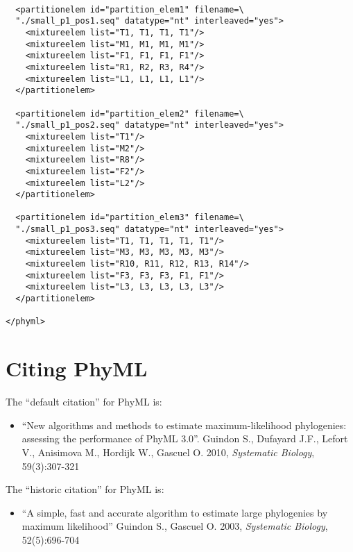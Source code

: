 \documentclass[a4paper,12pt]{article}
\begin{document}
\vspace{0.2cm}
\begin{Verbatim}[frame=single, label=Example of PhyML XML file (ctnd), samepage=true, baselinestretch=0.5]

  <partitionelem id="partition_elem1" filename=\
  "./small_p1_pos1.seq" datatype="nt" interleaved="yes">
    <mixtureelem list="T1, T1, T1, T1"/>
    <mixtureelem list="M1, M1, M1, M1"/>
    <mixtureelem list="F1, F1, F1, F1"/>
    <mixtureelem list="R1, R2, R3, R4"/>
    <mixtureelem list="L1, L1, L1, L1"/>
  </partitionelem>

  <partitionelem id="partition_elem2" filename=\
  "./small_p1_pos2.seq" datatype="nt" interleaved="yes">
    <mixtureelem list="T1"/>
    <mixtureelem list="M2"/>
    <mixtureelem list="R8"/>
    <mixtureelem list="F2"/>
    <mixtureelem list="L2"/>
  </partitionelem>

  <partitionelem id="partition_elem3" filename=\
  "./small_p1_pos3.seq" datatype="nt" interleaved="yes">
    <mixtureelem list="T1, T1, T1, T1, T1"/>
    <mixtureelem list="M3, M3, M3, M3, M3"/>
    <mixtureelem list="R10, R11, R12, R13, R14"/>
    <mixtureelem list="F3, F3, F3, F1, F1"/>
    <mixtureelem list="L3, L3, L3, L3, L3"/>
  </partitionelem>
  
</phyml>

\end{Verbatim}




\section{Citing PhyML}
The ``default citation'' for PhyML is:
\begin{itemize}
\item 
``New algorithms and methods to estimate maximum-likelihood phylogenies: assessing the performance
of PhyML 3.0''. Guindon S., Dufayard J.F., Lefort V., Anisimova M., Hordijk W., Gascuel O. 2010, {\it Systematic
  Biology}, 59(3):307-321

\end{itemize}
The ``historic citation'' for PhyML is:
\begin{itemize}
\item ``A simple, fast and accurate algorithm to estimate large phylogenies by maximum likelihood''
  Guindon S., Gascuel O. 2003, {\it Systematic Biology}, 52(5):696-704
\end{itemize}
\end{document}
